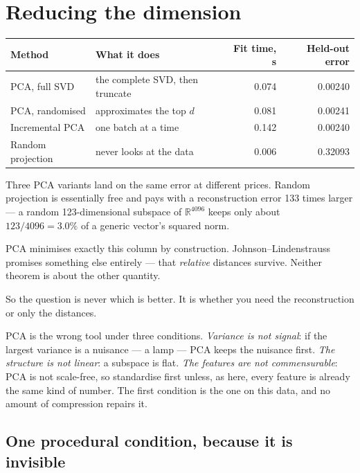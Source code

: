\documentclass[11pt,a4paper]{article}
\begin{document}
\section{Reducing the dimension}

\begin{center}
\small
\begin{tabular}{llr r}
\toprule
\textbf{Method} & \textbf{What it does} & \textbf{Fit time, s} &
\textbf{Held-out error} \\
\midrule
PCA, full SVD    & the complete SVD, then truncate & 0.074 & 0.00240 \\
PCA, randomised  & approximates the top $d$        & 0.081 & 0.00241 \\
Incremental PCA  & one batch at a time             & 0.142 & 0.00240 \\
Random projection& never looks at the data         & 0.006 & 0.32093 \\
\bottomrule
\end{tabular}
\end{center}

Three PCA variants land on the same error at different prices. Random
projection is essentially free and pays with a reconstruction error 133 times
larger --- a random 123-dimensional subspace of $\mathbb{R}^{4096}$ keeps only
about $123/4096 = 3.0\%$ of a generic vector's squared norm.

\begin{keybox}[title={That is not a bug in random projection}]
PCA minimises exactly this column by construction. Johnson--Lindenstrauss
promises something else entirely --- that \emph{relative} distances survive.
Neither theorem is about the other quantity.

So the question is never which is better. It is whether you need the
reconstruction or only the distances.
\end{keybox}

PCA is the wrong tool under three conditions. \emph{Variance is not signal}: if
the largest variance is a nuisance --- a lamp --- PCA keeps the nuisance first.
\emph{The structure is not linear}: a subspace is flat. \emph{The features are
not commensurable}: PCA is not scale-free, so standardise first unless, as
here, every feature is already the same kind of number. The first condition is
the one on this data, and no amount of compression repairs it.

\subsection{One procedural condition, because it is invisible}
\end{document}
